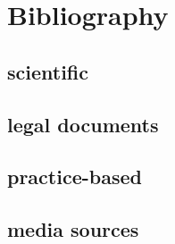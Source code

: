 \documentclass[11pt]{report}
\begin{document}
\nocite{*}
\newpage
\chapter*{Bibliography}

\begin{small}



\end{small}

\section{scientific}

\section{legal documents}
\section{practice-based}
\section{media sources}
\end{document}
